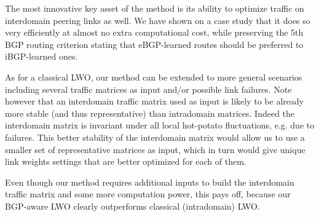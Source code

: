 \documentclass{acm_proc_article-sp}
\begin{document}
The most innovative key asset of the method is its ability to
optimize traffic on interdomain peering links as well.
We have shown on a case study that it does so very efficiently at almost no extra computational cost, 
while preserving 
the 5th BGP routing criterion stating that eBGP-learned routes should be preferred to iBGP-learned ones.

As for a classical LWO, our method can be extended to more general 
scenarios including several traffic matrices as input and/or possible link failures. 
Note however that an interdomain traffic matrix used as input is likely to be 
already more stable (and thus representative) than intradomain matrices. 
Indeed the interdomain matrix is invariant under all local hot-potato fluctuations, 
e.g. due to failures. This better stability of the interdomain matrix would allow us 
to use a smaller set of representative matrices as input, which in turn would give 
unique link weights settings that are better optimized for each of them.

Even though our method requires additional inputs to build the interdomain traffic matrix
and some more computation power, this pays off, because our BGP-aware LWO clearly
outperforms classical (intradomain) LWO.




\end{document}
